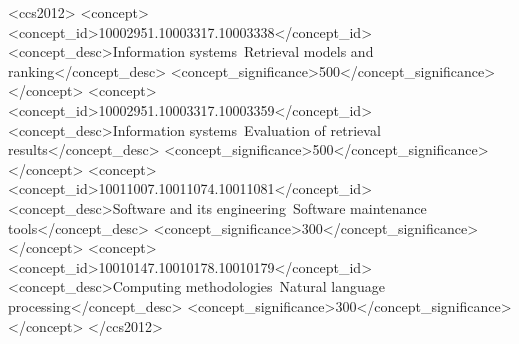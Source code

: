 \documentclass[acmsmall,review,anonymous,screen]{acmart}
\begin{document}
\begin{abstract}
We draw four conclusions for practitioners building agentic software
engineering tools. First, that query rewriting must augment retrieval rather than
substitute for it is already known --- it is reported in the query-rewriting
literature and the fuse-the-result-lists remedy dates to 2008 --- yet a deployed
pipeline can violate it while every component behaves correctly and the metric
its designers watch moves the right way. What we add is how to detect that: count
the relevant documents that never entered the candidate pool, and read a rising
MRR under stronger rerankers with a flat nDCG as the signature of a fetch fault
rather than a ranking one. Second, a bespoke retrieval-quality metric can invert the
ordering that standard IR metrics produce, so architectural claims resting on
one are not safe. Third, an apparent 0.23 faithfulness deficit for the
multi-agent system proved to be an artifact of answer \emph{format} --- a
structured template judged against fluent prose --- and vanished when the same
retrieval was synthesized through the baseline's own prompt (0.926 versus
0.931). Fourth, and least comfortable: with both defects repaired and the
synthesis model held constant, the multi-agent pipeline \emph{matches} rather
than beats the single-agent baseline on retrieval (nDCG@3 0.859 versus 0.863,
$n=100$) at roughly twice the latency, so decomposition per se is not what
produced the original result. We release the architecture, the evaluation
harness, and a 300-question benchmark mined from live release, advisory, and
community sources; these are available to reviewers on request and will be
published on acceptance.
\end{abstract}

\begin{CCSXML}
<ccs2012>
   <concept>
       <concept_id>10002951.10003317.10003338</concept_id>
       <concept_desc>Information systems~Retrieval models and ranking</concept_desc>
       <concept_significance>500</concept_significance>
       </concept>
   <concept>
       <concept_id>10002951.10003317.10003359</concept_id>
       <concept_desc>Information systems~Evaluation of retrieval results</concept_desc>
       <concept_significance>500</concept_significance>
       </concept>
   <concept>
       <concept_id>10011007.10011074.10011081</concept_id>
       <concept_desc>Software and its engineering~Software maintenance tools</concept_desc>
       <concept_significance>300</concept_significance>
       </concept>
   <concept>
       <concept_id>10010147.10010178.10010179</concept_id>
       <concept_desc>Computing methodologies~Natural language processing</concept_desc>
       <concept_significance>300</concept_significance>
       </concept>
 </ccs2012>
\end{CCSXML}
\end{document}
